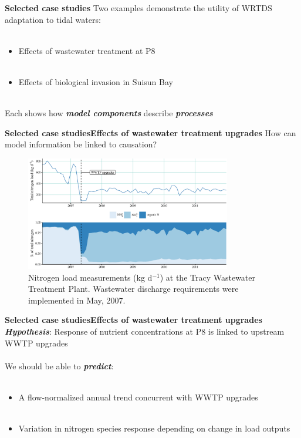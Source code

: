 \documentclass[serif]{beamer}\usepackage[]{graphicx}\usepackage[]{color}
\newcommand{\emtxt}[1]{\textbf{\textit{#1}}}
\begin{document}
\begin{frame}{\textbf{Selected case studies}}{\textbf{}}
\onslide<+->
Two examples demonstrate the utility of WRTDS adaptation to tidal waters: \\~\\
\begin{itemize}
\item Effects of wastewater treatment at P8 \\~\\
\item Effects of biological invasion in Suisun Bay\\~\\
\end{itemize}
\onslide<+->
Each shows how \emtxt{model components} describe \emtxt{processes}
\end{frame}



\begin{frame}{\textbf{Selected case studies}}{\textbf{Effects of wastewater treatment upgrades}}
How can model information be linked to causation?
\vspace{0.1in}
\begin{figure}
\centerline{\includegraphics[width = 0.8\textwidth]{fig/tracy.pdf}}
\caption{Nitrogen load measurements (kg d$^{-1}$) at the Tracy Wastewater Treatment Plant.  Wastewater discharge requirements were implemented in May, 2007.}
\end{figure}
\end{frame}

\begin{frame}{\textbf{Selected case studies}}{\textbf{Effects of wastewater treatment upgrades}}
\emtxt{Hypothesis}: Response of nutrient concentrations at P8 is linked to upstream WWTP upgrades \\~\\
We should be able to \emtxt{predict}: \\~\\
\begin{itemize}
\item A flow-normalized annual trend concurrent with WWTP upgrades \\~\\
\item Variation in nitrogen species response depending on change in load outputs
\end{itemize}
\end{frame}
\end{document}
